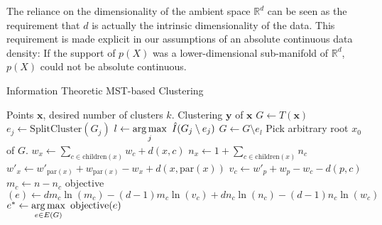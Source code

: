 The reliance on the dimensionality of the ambient space $\mathbb{R}^d$ can be
seen as the requirement that $d$ is actually the intrinsic dimensionality of
the data.
This requirement is made explicit in our assumptions of an absolute continuous
data density: If the support of $p(X)$ was a lower-dimensional sub-manifold of
$\mathbb{R}^d$, $p(X)$ could not be absolute continuous.


\begin{algorithm}[t]
\caption{Information Theoretic MST-based Clustering}

\begin{algorithmic}\label{overall}
    \Require Points $\mathbf{x}$, desired number of clusters $k$.
    \Ensure Clustering $\mathbf{y}$ of $\mathbf{x}$
    \State $G \leftarrow T(\mathbf{x})$
            \State $e_j \leftarrow \text{SplitCluster}(G_j)$
        \EndFor
        \State $l \leftarrow \displaystyle \operatorname*{arg\,max}_j\  \hat{I}(G_j \setminus e_j)$
        \State $G \leftarrow G \setminus e_l$
    \EndFor
    \Statex
        \State Pick arbitrary root $x_0$ of $G$.
            \State $w_x \leftarrow \displaystyle \sum_{c \in \text{children}(x)} w_c + d(x, c)$
            \State $n_x \leftarrow \displaystyle 1 + \sum_{c \in \text{children}(x)} n_c$
        \EndFor
        \State $w'_x \leftarrow w'_{\text{par}(x)} + w_{\text{par}(x)} - w_x + d(x, \text{par}(x))$
        \EndFor
            \State $v_c \leftarrow w'_p + w_p - w_c - d(p,c)$
            \State $m_c \leftarrow n - n_c$
            \State objective$(e) \leftarrow d m_c \ln(m_c) - (d-1) m_c \ln(v_c) + d n_c \ln(n_c) - (d-1) n_c \ln (w_c)$
        \EndFor
        \State $e^* \leftarrow \displaystyle \operatorname*{arg\,max}_{e \in E(G)} \ \text{objective}(e)$
        
    \EndFunction
\end{algorithmic}
\end{algorithm}

